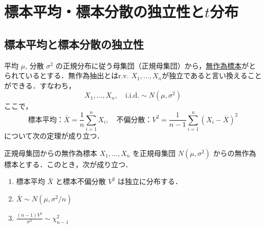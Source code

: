 \documentclass[main.tex]{subfiles}
\begin{document}
\section{標本平均・標本分散の独立性と$t$分布}

\subsection{標本平均と標本分散の独立性}

平均 $\mu$, 分散 $\sigma^2$ の正規分布に従う母集団（正規母集団）から，\hyperref[def:random_sample]{無作為標本}がとられているとする．無作為抽出とはr.v. $X_1, \dots, X_n$が独立であると言い換えることができる．すなわち，
\begin{equation}
    X_1, \dots, X_n, \quad \text{i.i.d.} \sim N(\mu, \sigma^2)
    \label{eq:random_sample}
\end{equation}
ここで，
\begin{equation}
  標本平均： \bar{X} = \frac{1}{n}\sum_{i=1}^{n} X_i, \quad 不偏分散： V^2 = \frac{1}{n-1}\sum_{i=1}^{n} (X_i - \bar{X})^2
\end{equation}
について次の定理が成り立つ．

\begin{mytheorem}{正規母集団からの無作為標本}
$X_1, \dots, X_n$ を正規母集団 $N(\mu, \sigma^2)$ からの無作為標本とする．このとき，次が成り立つ．
\begin{enumerate}[label=(\arabic*)]
    \item 標本平均 $\bar{X}$ と標本不偏分散 $V^2$ は独立に分布する．
    \item $\bar{X} \sim N(\mu, \sigma^2/n)$
    \item $\frac{(n-1)V^2}{\sigma^2} \sim \chi^2_{n-1}$
\end{enumerate}
\end{mytheorem}
\end{document}
